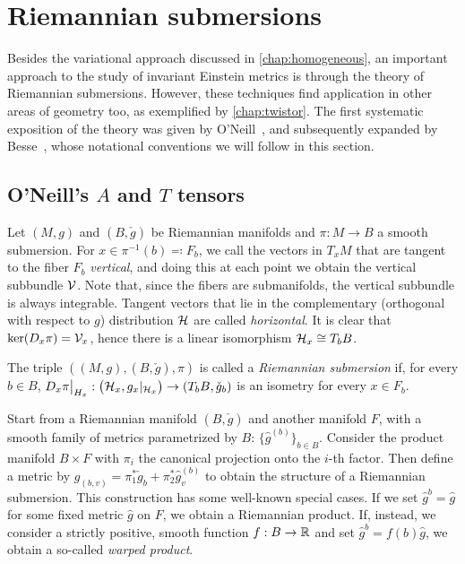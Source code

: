 \chapter{Riemannian submersions}
\label{app:submersions}

Besides the variational approach discussed in \cref{chap:homogeneous}, an important approach to the study of invariant Einstein metrics is through the theory of Riemannian submersions. However, these techniques find application in other areas of geometry too, as exemplified by \cref{chap:twistor}. The first systematic exposition of the theory was given by O'Neill~\cite{ON1966}, and subsequently expanded by Besse~\cite[Ch.~9]{Bes2008}, whose notational conventions we will follow in this section.

\section{O'Neill's \texorpdfstring{$A$}{A} and \texorpdfstring{$T$}{T} tensors}

Let $(M,g)$ and $(B,\check g)$ be Riemannian manifolds and $\pi:M\to B$ a smooth submersion. For $x\in \pi^{-1}(b)\eqqcolon F_b$, we call the vectors in $T_xM$ that are tangent to the fiber $F_b$ \emph{vertical}, and doing this at each point we obtain the vertical subbundle $\mathcal{V}$. Note that, since the fibers are submanifolds, the vertical subbundle is always integrable. Tangent vectors that lie in the complementary (orthogonal with respect to $g$) distribution $\mathcal{H}$ are called \emph{horizontal}. It is clear that $\ker(D_x \pi)=\mathcal{V}_x$, hence there is a linear isomorphism $\mathcal{H}_x\cong T_bB$.

\begin{mydef}
	The triple $((M,g),(B,\check g),\pi)$ is called a \emph{Riemannian submersion} if, for every $b\in B$, $D_x\pi\big|_{H_x}:\big(\mathcal{H}_x,g_x|_{\mathcal{H}_x}\big)\to (T_b B,\check g_b)$ is an isometry for every $x\in F_b$. 
\end{mydef}

\begin{ex}
	Start from a Riemannian manifold $(B,\check g)$ and another manifold $F$, with a smooth family of metrics parametrized by $B$: $\{\hat g^{(b)}\}_{b\in B}$. Consider the product manifold $B\times F$ with $\pi_i$ the canonical projection onto the $i$-th factor. Then define a metric by $g_{(b,v)}=\pi_1^*\check g_b+\pi_2^*\hat g^{(b)}_v$ to obtain the structure of a Riemannian submersion. This construction has some well-known special cases. If we set $\hat g^b=\hat g$ for some fixed metric $\hat g$ on $F$, we obtain a Riemannian product. If, instead, we consider a strictly positive, smooth function $f:B\to \mathbb{R}$ and set $\hat g^b=f(b)\hat g$, we obtain a so-called \emph{warped product}.
\end{ex}

